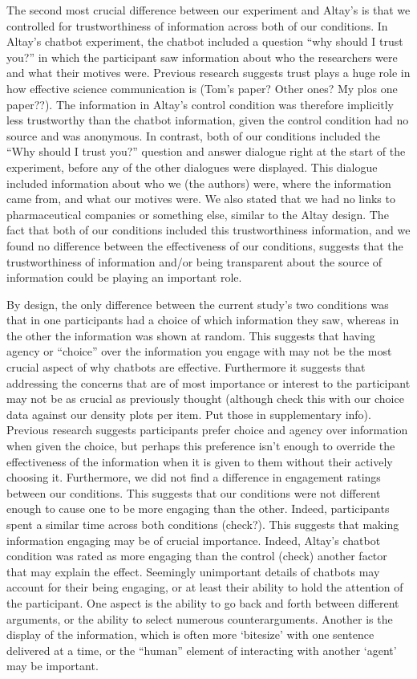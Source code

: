 \documentclass[
  english,
  ,jou,floatsintext]{apa6}
\begin{document}
The second most crucial difference between our experiment and Altay's is that we controlled for trustworthiness of information across both of our conditions. In Altay's chatbot experiment, the chatbot included a question ``why should I trust you?'' in which the participant saw information about who the researchers were and what their motives were. Previous research suggests trust plays a huge role in how effective science communication is (Tom's paper? Other ones? My plos one paper??). The information in Altay's control condition was therefore implicitly less trustworthy than the chatbot information, given the control condition had no source and was anonymous. In contrast, both of our conditions included the ``Why should I trust you?'' question and answer dialogue right at the start of the experiment, before any of the other dialogues were displayed. This dialogue included information about who we (the authors) were, where the information came from, and what our motives were. We also stated that we had no links to pharmaceutical companies or something else, similar to the Altay design. The fact that both of our conditions included this trustworthiness information, and we found no difference between the effectiveness of our conditions, suggests that the trustworthiness of information and/or being transparent about the source of information could be playing an important role.

By design, the only difference between the current study's two conditions was that in one participants had a choice of which information they saw, whereas in the other the information was shown at random. This suggests that having agency or ``choice'' over the information you engage with may not be the most crucial aspect of why chatbots are effective. Furthermore it suggests that addressing the concerns that are of most importance or interest to the participant may not be as crucial as previously thought (although check this with our choice data against our density plots per item. Put those in supplementary info). Previous research suggests participants prefer choice and agency over information when given the choice, but perhaps this preference isn't enough to override the effectiveness of the information when it is given to them without their actively choosing it. Furthermore, we did not find a difference in engagement ratings between our conditions. This suggests that our conditions were not different enough to cause one to be more engaging than the other. Indeed, participants spent a similar time across both conditions (check?). This suggests that making information engaging may be of crucial importance. Indeed, Altay's chatbot condition was rated as more engaging than the control (check) another factor that may explain the effect. Seemingly unimportant details of chatbots may account for their being engaging, or at least their ability to hold the attention of the participant. One aspect is the ability to go back and forth between different arguments, or the ability to select numerous counterarguments. Another is the display of the information, which is often more `bitesize' with one sentence delivered at a time, or the ``human'' element of interacting with another `agent' may be important.
\end{document}
